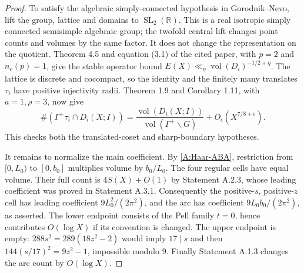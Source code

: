 \begin{proof}
To satisfy the algebraic simply-connected hypothesis in Gorodnik--Nevo,
lift the group, lattice and domains to $\operatorname{SL}_2(\mathbb R)$.
This is a real isotropic simply connected semisimple algebraic group;
the twofold central lift changes point counts and volumes by the same
factor. It does not change the representation on the quotient.
Theorem 4.5 and equation (3.1) of the cited paper, with $p=2$ and
$n_e(p)=1$, give the stable operator bound
$E(X)\ll_\eta\operatorname{vol}(D_i)^{-1/2+\eta}$.
The lattice is discrete and cocompact, so the identity and the finitely
many translates $\tau_i$ have positive injectivity radii. Theorem 1.9
and Corollary 1.11, with $a=1,\rho=3$, now give
\[
 \#(\Gamma^+\tau_i\cap D_i(X;I))
 =\frac{\operatorname{vol}(D_i(X;I))}
        {\operatorname{vol}(\Gamma^+\backslash G)}
    +O_\epsilon(X^{7/8+\epsilon}).
\]
This checks both the translated-coset and sharp-boundary hypotheses.

It remains to normalize the main coefficient. By
\eqref{A:Haar-ABA}, restriction from $[0,L_0)$ to $[0,b_0]$ multiplies
volume by $b_0/L_0$. The four regular cells have equal volume. Their
full count is $4S(X)+O(1)$ by Statement A.2.3, whose leading coefficient
was proved in Statement A.3.1. Consequently the positive-$s$, positive-$z$
cell has leading coefficient $9L_0^2/(2\pi^2)$, and the arc has coefficient
$9L_0b_0/(2\pi^2)$, as asserted.
The lower endpoint consists of the Pell family $t=0$, hence contributes
$O(\log X)$ if its convention is changed. The upper endpoint is empty:
$288s^2=289(18z^2-2)$ would imply $17\mid s$ and then
$144(s/17)^2=9z^2-1$, impossible modulo $9$.
Finally Statement A.1.3 changes the arc count by $O(\log X)$.
\end{proof}


